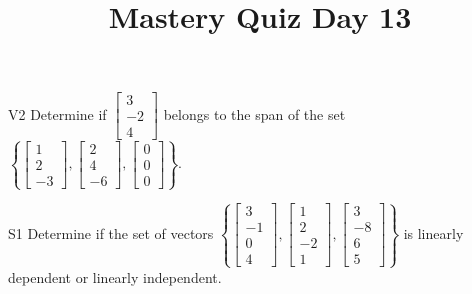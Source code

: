 \documentclass{sbgLAquiz}
\title{Mastery Quiz Day 13 }
\begin{document}
\begin{problem}{V2}
  Determine if
  \(\begin{bmatrix} 3 \\ -2 \\ 4 \end{bmatrix}\)
  belongs to the span of the set
  \(\left\{
    \begin{bmatrix} 1 \\ 2 \\ -3 \end{bmatrix},
    \begin{bmatrix} 2 \\ 4 \\ -6 \end{bmatrix},
    \begin{bmatrix} 0 \\ 0 \\ 0 \end{bmatrix}
    \right\}
  \).
\end{problem}

\begin{problem}{S1}
Determine if the set of vectors $\left\{\begin{bmatrix} 3 \\ -1 \\ 0 \\ 4 \end{bmatrix}, \begin{bmatrix} 1  \\ 2 \\ -2 \\ 1 \end{bmatrix}, \begin{bmatrix} 3 \\ -8 \\ 6 \\ 5 \end{bmatrix} \right\}$  is linearly dependent or linearly independent.
\end{problem}
\end{document}
